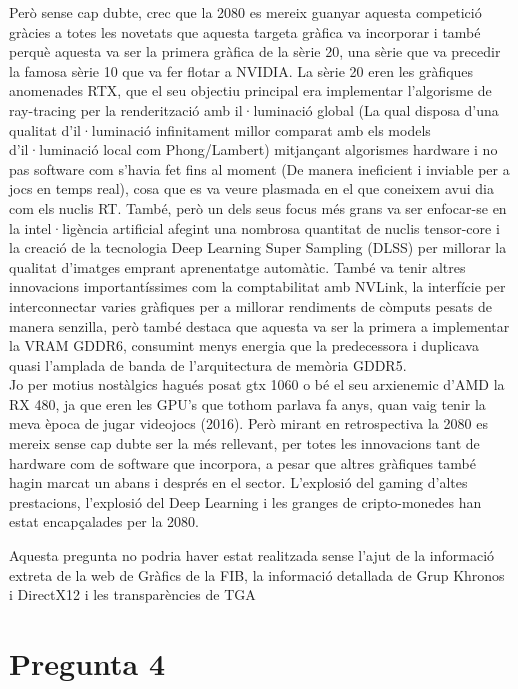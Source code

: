 \documentclass[12pt]{article}
\begin{document}
Però sense cap dubte, crec que la 2080 es mereix guanyar aquesta competició gràcies a totes les novetats que aquesta targeta gràfica va incorporar i també perquè aquesta va ser la primera gràfica de la 
sèrie 20, una sèrie que va precedir la famosa sèrie 10 que va fer flotar a NVIDIA. La sèrie 20 eren les gràfiques anomenades RTX, que el seu objectiu principal era implementar l'algorisme de ray-tracing per la 
renderització amb il·luminació global (La qual disposa d'una qualitat d'il·luminació infinitament millor comparat amb els models d'il·luminació local com Phong/Lambert) mitjançant algorismes hardware i no pas software com 
s'havia fet fins al moment (De manera ineficient i inviable per a jocs en temps real), cosa que es va veure plasmada en el que coneixem avui dia com els nuclis RT. També, però un dels seus focus més grans va ser enfocar-se en 
la intel·ligència artificial afegint una nombrosa quantitat de nuclis tensor-core i la creació de la tecnologia Deep Learning Super Sampling (DLSS) per millorar la qualitat d'imatges emprant aprenentatge automàtic. També va tenir altres 
innovacions importantíssimes com la comptabilitat amb NVLink, la interfície per interconnectar varies gràfiques per a millorar rendiments de còmputs pesats de manera senzilla, però també destaca que aquesta va ser la primera a 
implementar la VRAM GDDR6, consumint menys energia que la predecessora i duplicava quasi l'amplada de banda de l'arquitectura de memòria GDDR5. 
\\

Jo per motius nostàlgics hagués posat gtx 1060 o bé el seu arxienemic d'AMD la RX 480, ja que eren les GPU's que tothom parlava fa anys, quan vaig tenir la meva època de jugar videojocs (2016). Però mirant en retrospectiva 
la 2080 es mereix sense cap dubte ser la més rellevant, per totes les innovacions tant de hardware com de software que incorpora, a pesar que altres gràfiques també hagin marcat un abans i després en el sector. L'explosió del gaming d'altes prestacions, l'explosió del Deep Learning i les granges de cripto-monedes han estat encapçalades per la 2080.

Aquesta pregunta no podria haver estat realitzada sense l'ajut de la informació extreta de la web de Gràfics de la FIB\cite{cs_upc_virtual}, la informació detallada de Grup Khronos\cite{khronos_opengl} i DirectX12\cite{microsoft_directx12} i les transparències de TGA\cite{graphics_cards_slides}

\section{Pregunta 4}
\end{document}
